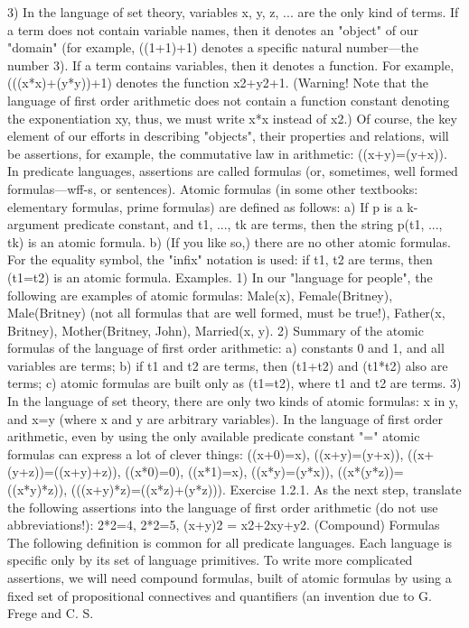 3) In the language of set theory, variables x, y, z, ... are the only kind of terms.
If a term does not contain variable names, then it denotes an "object" of our "domain" (for example,
((1+1)+1) denotes a specific natural number---the number 3). If a term contains variables, then it denotes
a function. For example, (((x*x)+(y*y))+1) denotes the function x2+y2+1. (Warning! Note that the
language of first order arithmetic does not contain a function constant denoting the exponentiation xy,
thus, we must write x*x instead of x2.)
Of course, the key element of our efforts in describing "objects", their properties and relations, will be
assertions, for example, the commutative law in arithmetic: ((x+y)=(y+x)). In predicate languages,
assertions are called formulas (or, sometimes, well formed formulas---wff-s, or sentences).
Atomic formulas (in some other textbooks: elementary formulas, prime formulas) are defined as follows:
a) If p is a k-argument predicate constant, and t1, ..., tk are terms, then the string p(t1, ..., tk) is an atomic
formula.
b) (If you like so,) there are no other atomic formulas.
For the equality symbol, the "infix" notation is used: if t1, t2 are terms, then (t1=t2) is an atomic formula.
Examples. 1) In our "language for people", the following are examples of atomic formulas: Male(x), Female(Britney),
Male(Britney) (not all formulas that are well formed, must be true!), Father(x, Britney), Mother(Britney, John), Married(x, y).
2) Summary of the atomic formulas of the language of first order arithmetic: a) constants 0 and 1, and all variables are terms;
b) if t1 and t2 are terms, then (t1+t2) and (t1*t2) also are terms; c) atomic formulas are built only as (t1=t2), where t1 and t2 are
terms.
3) In the language of set theory, there are only two kinds of atomic formulas: x in y, and x=y (where x and y are arbitrary
variables).
In the language of first order arithmetic, even by using the only available predicate constant "=" atomic
formulas can express a lot of clever things:
((x+0)=x), ((x+y)=(y+x)), ((x+(y+z))=((x+y)+z)),
((x*0)=0), ((x*1)=x), ((x*y)=(y*x)), ((x*(y*z))=((x*y)*z)),
(((x+y)*z)=((x*z)+(y*z))).
Exercise 1.2.1. As the next step, translate the following assertions into the language of first order
arithmetic (do not use abbreviations!): 2*2=4, 2*2=5, (x+y)2 = x2+2xy+y2.
(Compound) Formulas
The following definition is common for all predicate languages. Each language is specific only by its
set of language primitives.
To write more complicated assertions, we will need compound formulas, built of atomic formulas by
using a fixed set of propositional connectives and quantifiers (an invention due to G. Frege and C. S.
